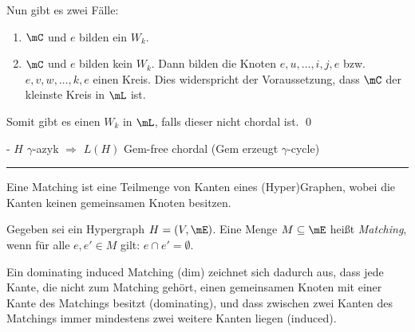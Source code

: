 \begin{Proof}
{}

Nun gibt es zwei Fälle:
\begin{enumerate}
    \item $\mC$ und $e$ bilden ein $W_k$.
    \item $\mC$ und $e$ bilden kein $W_k$. Dann bilden die Knoten $e,u,\ldots,i,j,e$ bzw.  $e,v,w,\ldots,k,e$ einen Kreis. Dies widerspricht der Voraussetzung, dass $\mC$ der kleinste Kreis in $\mL$ ist.
\end{enumerate}
Somit gibt es einen $W_k$ in $\mL$, falls dieser nicht chordal ist. \qed
\end{Proof}

- $H$ $\gamma$-azyk $\Rightarrow$ $L(H)$ Gem-free chordal (Gem erzeugt $\gamma$-cycle)

\rule{\linewidth}{1pt}
\clearpage


Eine Matching ist eine Teilmenge von Kanten eines (Hyper)Graphen, wobei die Kanten keinen gemeinsamen Knoten besitzen.

\begin{mydef}\label{def:Matching}
Gegeben sei ein Hypergraph $H=(V,\mE)$. Eine Menge $M \subseteq \mE$ heißt \emph{Matching}, wenn für alle $e,e' \in M$ gilt: $e\cap e' = \emptyset$.
\end{mydef}

Ein dominating induced Matching (dim) zeichnet sich dadurch aus, dass jede Kante, die nicht zum Matching gehört, einen gemeinsamen Knoten mit einer Kante des Matchings besitzt (dominating), und dass zwischen zwei Kanten des Matchings immer mindestens zwei weitere Kanten liegen (induced).

